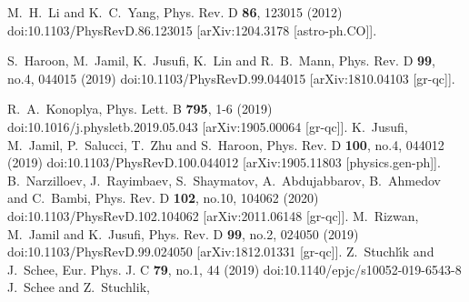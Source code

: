 \documentclass[a4paper,11pt]{article}
\begin{document}
\begin{thebibliography}{100}
M.~H.~Li and K.~C.~Yang,
Phys. Rev. D \textbf{86}, 123015 (2012)
doi:10.1103/PhysRevD.86.123015
[arXiv:1204.3178 [astro-ph.CO]].

S.~Haroon, M.~Jamil, K.~Jusufi, K.~Lin and R.~B.~Mann,
Phys. Rev. D \textbf{99}, no.4, 044015 (2019)
doi:10.1103/PhysRevD.99.044015
[arXiv:1810.04103 [gr-qc]].

R.~A.~Konoplya,
Phys. Lett. B \textbf{795}, 1-6 (2019)
doi:10.1016/j.physletb.2019.05.043
[arXiv:1905.00064 [gr-qc]].
K.~Jusufi, M.~Jamil, P.~Salucci, T.~Zhu and S.~Haroon,
Phys. Rev. D \textbf{100}, no.4, 044012 (2019)
doi:10.1103/PhysRevD.100.044012
[arXiv:1905.11803 [physics.gen-ph]].
B.~Narzilloev, J.~Rayimbaev, S.~Shaymatov, A.~Abdujabbarov, B.~Ahmedov and C.~Bambi,
Phys. Rev. D \textbf{102}, no.10, 104062 (2020)
doi:10.1103/PhysRevD.102.104062
[arXiv:2011.06148 [gr-qc]].
M.~Rizwan, M.~Jamil and K.~Jusufi,
Phys. Rev. D \textbf{99}, no.2, 024050 (2019)
doi:10.1103/PhysRevD.99.024050
[arXiv:1812.01331 [gr-qc]].
Z.~Stuchl\'\i{}k and J.~Schee,
Eur. Phys. J. C \textbf{79}, no.1, 44 (2019)
doi:10.1140/epjc/s10052-019-6543-8
J.~Schee and Z.~Stuchlik,

\end{thebibliography}
\end{document}
